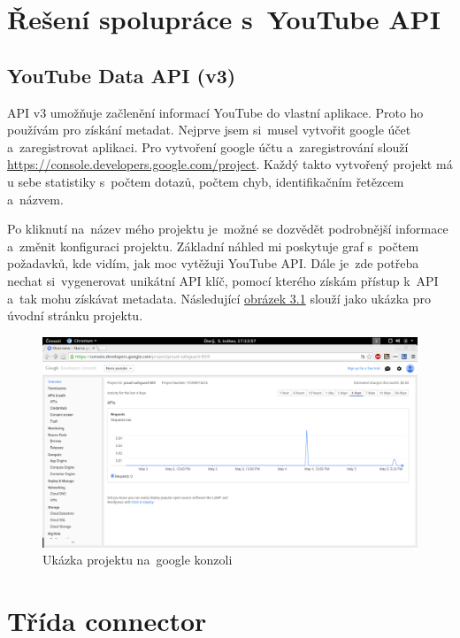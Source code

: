 \section{Řešení spolupráce s~YouTube API}
\subsection{YouTube Data API (v3)}
\par API v3\cite{apiv3} umožňuje začlenění informací YouTube do vlastní aplikace. Proto ho používám pro získání metadat. Nejprve jsem si~musel vytvořit google účet a~zaregistrovat aplikaci. Pro vytvoření google účtu a~zaregistrování slouží \url{https://console.developers.google.com/project}\cite{googleconsole}. Každý takto vytvořený projekt má u sebe statistiky s~počtem dotazů, počtem chyb, identifikačním řetězcem a~názvem. 
\par Po kliknutí na~název mého projektu je~možné se dozvědět podrobnější informace a~změnit konfiguraci projektu. Základní náhled mi poskytuje graf s~počtem požadavků, kde vidím, jak moc vytěžuji YouTube API\cite{apiv3}. Dále je~zde potřeba nechat si~vygenerovat unikátní API klíč, pomocí kterého získám přístup k~API a~tak mohu získávat metadata. Následující \hyperlink{consolesample}{obrázek 3.1} slouží jako ukázka pro úvodní stránku projektu.
\begin{figure}[h!]
	\hypertarget{consolesample}{}
	\centering
	\includegraphics[width=\textwidth]{obrazova_priloha/my_projekt.png}
	\caption{Ukázka projektu na~google konzoli}
\end{figure}

\section{Třída connector}
